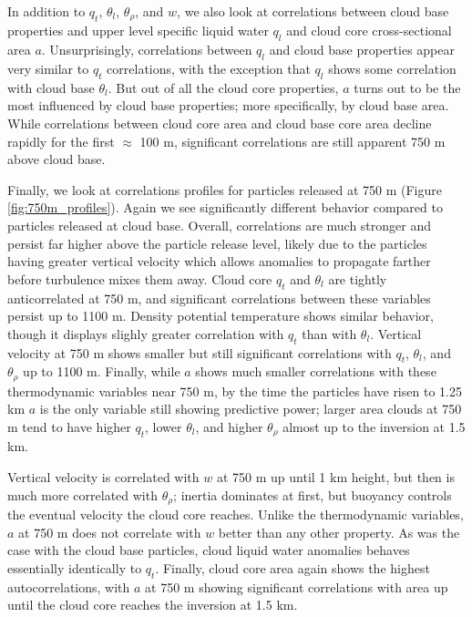 \documentclass[acp]{copernicus}
\begin{document}
In addition to $q_t$, $\theta_l$, $\theta_\rho$, and $w$, we also look at 
correlations between cloud base properties and upper level specific liquid 
water $q_l$ and cloud core cross-sectional area $a$.  Unsurprisingly, 
correlations between $q_l$ and cloud base properties appear very similar to 
$q_t$ correlations, with the exception that $q_l$ shows some correlation with 
cloud base $\theta_l$.  But out of all the cloud core properties, $a$ turns 
out to be the most influenced by cloud base properties; more specifically, by 
cloud base area.  While correlations between cloud core area and cloud base 
core area decline rapidly for the first $\approx$ 100 m, significant 
correlations are still apparent 750 m above cloud base.

Finally, we look at correlations profiles for particles released at 750 m 
(Figure \ref{fig:750m_profiles}).  Again we see significantly different 
behavior compared to particles released at cloud base.  Overall, correlations 
are much stronger and persist far higher above the particle release level, 
likely due to the particles having greater vertical velocity which allows 
anomalies to propagate farther before turbulence mixes them away.  Cloud core 
$q_t$ and $\theta_l$ are tightly anticorrelated at 750 m, and significant 
correlations between these variables persist up to 1100 m.  Density potential 
temperature shows similar behavior, though it displays slighly greater 
correlation with $q_t$ than with $\theta_l$.  Vertical velocity at 750 m shows 
smaller but still significant correlations with $q_t$, $\theta_l$, and 
$\theta_\rho$ up to 1100 m.  Finally, while $a$ shows much smaller 
correlations with these thermodynamic variables near 750 m, by the time the 
particles have risen to 1.25 km $a$ is the only variable still showing 
predictive power; larger area clouds at 750 m tend to have higher $q_t$, lower 
$\theta_l$, and higher $\theta_\rho$ almost up to the inversion at 1.5 km.

Vertical velocity is correlated with $w$ at 750 m up until 1 km height, but 
then is much more correlated with $\theta_\rho$; inertia dominates at first,
but buoyancy controls the eventual velocity the cloud core reaches.  Unlike 
the thermodynamic variables, $a$ at 750 m does not correlate with $w$ 
better than any other property.  As was the case with the cloud base particles, 
cloud liquid water anomalies behaves essentially identically to $q_t$. Finally, 
cloud core area again shows the highest autocorrelations, with $a$ at 750 m 
showing significant correlations with area up until the cloud core reaches the 
inversion at 1.5 km.
\end{document}
